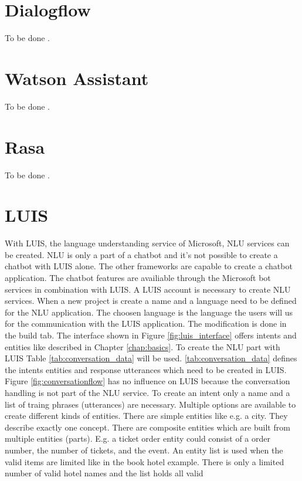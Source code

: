 \section{Dialogflow}
To be done \cite{dialogflow}.

\section{Watson Assistant}
To be done \cite{watsonassistant}.
 
\section{Rasa}
To be done \cite{rasa}.

\section{LUIS}
With LUIS\cite{luisdocs}, the language understanding service of Microsoft,
NLU services can be created.
NLU is only a part of a chatbot and it's not possible 
to create a chatbot with LUIS alone.
The other frameworks are capable to create a chatbot application.
The chatbot features are availiable through the Microsoft bot services 
in combination with LUIS.
A LUIS account is necessary to create NLU services.
When a new project is create a name and a language need to be defined for 
the NLU application.
The choosen language is the language the users will us for the communication with the 
LUIS application.
The modification is done in the build tab.
The interface shown in Figure \ref{fig:luis_interface} offers intents and entities
like described in Chapter \ref{chap:basics}.
To create the NLU part with LUIS Table \ref{tab:conversation_data} will be used.
\ref{tab:conversation_data} defines the intents entities and response utterances
which need to be created in LUIS.
Figure \ref{fig:conversationflow} has no influence on LUIS because the 
conversation handling is not part of the NLU service.
To create an intent only a name and a list of traing phrases (utterances) are necessary.
Multiple options are available to create different kinds of entities.
There are simple entities like e.g. a city.
They describe exactly one concept.
There are composite entities which are built from multiple entities (parts).
E.g. a ticket order entity could consist of a order number, the number of 
tickets, and the event.
An entity list is used when the valid items are limited like in the book hotel example.
There is only a limited number of valid hotel names and the list holds all valid 
